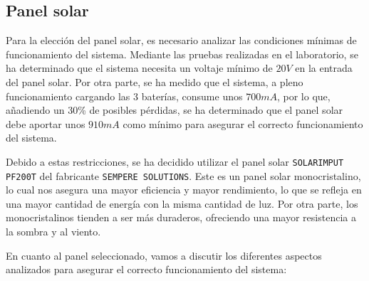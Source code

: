 \subsection{Panel solar}\label{subsec:panel_solar}
Para la elección del panel solar, es necesario analizar las condiciones mínimas de funcionamiento del sistema. Mediante las pruebas realizadas en el laboratorio, se ha determinado que el sistema necesita un voltaje mínimo de $20 V$ en la entrada del panel solar. Por otra parte, se ha medido que el sistema, a pleno funcionamiento cargando las 3 baterías, consume unos $700 mA$, por lo que, añadiendo un 30\% de posibles pérdidas, se ha determinado que el panel solar debe aportar unos $910 mA$ como mínimo para asegurar el correcto funcionamiento del sistema.

Debido a estas restricciones, se ha decidido utilizar el panel solar \texttt{SOLARIMPUT PF200T} del fabricante \texttt{SEMPERE SOLUTIONS}. Este es un panel solar monocristalino, lo cual nos asegura una mayor eficiencia y mayor rendimiento, lo que se refleja en una mayor cantidad de energía con la misma cantidad de luz. Por otra parte, los monocristalinos tienden a ser más duraderos, ofreciendo una mayor resistencia a la sombra y al viento. \cite{autosolarDiferenciasEntreSilicio} 

En cuanto al panel seleccionado, vamos a discutir los diferentes aspectos analizados para asegurar el correcto funcionamiento del sistema:

